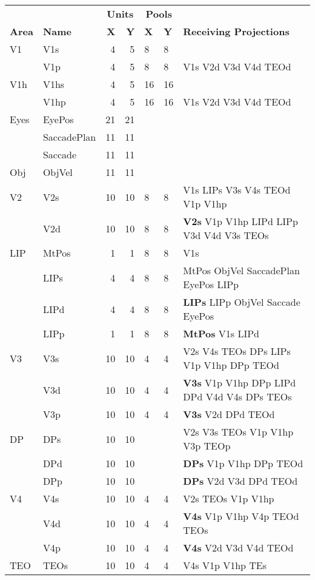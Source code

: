 \begin{table}
  \centering
\begin{tabular}{llrrlll}
\hline
     &      & \multicolumn{2}{c}{{\bf Units}} & \multicolumn{2}{c}{{\bf Pools}} & \\
{\bf Area} & {\bf Name} & {\bf X} & {\bf Y} & {\bf X} & {\bf Y} & {\bf Receiving Projections} \\
\hline
V1 & V1s & 4 & 5 & 8 & 8 &  \\
   & V1p & 4 & 5 & 8 & 8 & V1s V2d V3d V4d TEOd  \\
V1h & V1hs & 4 & 5 & 16 & 16 &  \\
   & V1hp & 4 & 5 & 16 & 16 & V1s V2d V3d V4d TEOd  \\
Eyes & EyePos & 21 & 21 & & &  \\
     & SaccadePlan & 11 & 11 & & &  \\
     & Saccade & 11 & 11 & & &  \\
Obj & ObjVel & 11 & 11 & & & \\
V2 & V2s & 10 & 10 & 8 & 8 & V1s LIPs V3s V4s TEOd V1p V1hp \\
   & V2d & 10 & 10 & 8 & 8 & {\bf V2s} V1p V1hp LIPd LIPp V3d V4d V3s TEOs \\
LIP & MtPos& 1 & 1 & 8 & 8 & V1s \\
    & LIPs & 4 & 4 & 8 & 8 & MtPos ObjVel SaccadePlan EyePos LIPp \\
    & LIPd & 4 & 4 & 8 & 8 & {\bf LIPs} LIPp ObjVel Saccade EyePos \\
    & LIPp & 1 & 1 & 8 & 8 & {\bf MtPos} V1s LIPd \\
V3 & V3s & 10 & 10 & 4 & 4 & V2s V4s TEOs DPs LIPs V1p V1hp DPp TEOd \\
   & V3d & 10 & 10 & 4 & 4 & {\bf V3s} V1p V1hp DPp LIPd DPd V4d V4s DPs TEOs \\
   & V3p & 10 & 10 & 4 & 4 & {\bf V3s} V2d DPd TEOd \\
DP & DPs & 10 & 10 & & & V2s V3s TEOs V1p V1hp V3p TEOp \\
   & DPd & 10 & 10 & & & {\bf DPs} V1p V1hp DPp TEOd \\
   & DPp & 10 & 10 & & & {\bf DPs} V2d V3d DPd TEOd \\
V4 & V4s & 10 & 10 & 4 & 4 & V2s TEOs V1p V1hp \\
   & V4d & 10 & 10 & 4 & 4 & {\bf V4s} V1p V1hp V4p TEOd TEOs \\
   & V4p & 10 & 10 & 4 & 4 & {\bf V4s} V2d V3d V4d TEOd \\
TEO & TEOs & 10 & 10 & 4 & 4 & V4s V1p V1hp TEs\\

\end{tabular}
\end{table}
